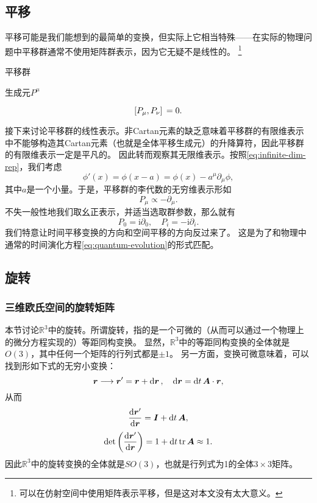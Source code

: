 \documentclass[hyperref, UTF8, a4paper]{ctexart}
\newcommand*{\ii}{\mathrm{i}}
\newcommand*{\reals}{\mathbb{R}}
\begin{document}
\subsection{平移}\label{sec:translation}

平移可能是我们能想到的最简单的变换，但实际上它相当特殊——在实际的物理问题中平移群通常不使用矩阵群表示，因为它无疑不是线性的。%
\footnote{可以在仿射空间中使用矩阵表示平移，但是这对本文没有太大意义。}

平移群

生成元$P^\mu$

\begin{equation}
    \comm*{P_\mu}{P_\nu} = 0.
    \label{eq:comm-of-trans}
\end{equation}

接下来讨论平移群的线性表示。非Cartan元素的缺乏意味着平移群的有限维表示中不能够构造其Cartan元素（也就是全体平移生成元）的升降算符，因此平移群的有限维表示一定是平凡的。
因此转而观察其无限维表示。按照\eqref{eq:infinite-dim-rep}，我们考虑
\[
    \phi'(x) = \phi(x - a) = \phi(x) - a^\mu \partial_\mu \phi,
\]
其中$a$是一个小量。于是，平移群的李代数的无穷维表示形如
\[
    P_\mu \propto - \partial_\mu.
\]
不失一般性地我们取幺正表示，并适当选取群参数，那么就有
\begin{equation}
    P_0 = \ii \partial_0, \quad P_i = - \ii \partial_i.
    \label{eq:transition-inf-rep}
\end{equation}
我们特意让时间平移变换的方向和空间平移的方向反过来了。
这是为了和物理中通常的时间演化方程\eqref{eq:quantum-evolution}的形式匹配。

\subsection{旋转}\label{sec:rotation}

\subsubsection{三维欧氏空间的旋转矩阵}

本节讨论$\reals^3$中的旋转。所谓旋转，指的是一个可微的（从而可以通过一个物理上的微分方程实现的）等距同构变换。
显然，$\reals^3$中的等距同构变换的全体就是$O(3)$，其中任何一个矩阵的行列式都是$\pm 1$。
另一方面，变换可微意味着，可以找到形如下式的无穷小变换：
\[
    \vb*{r} \longrightarrow \vb*{r}' = \vb*{r} + \dd{\vb*{r}}, \quad \dd{\vb*{r}} = \dd{t} \vb*{A} \cdot \vb*{r},
\]
从而
\[
    \dv{\vb*{r}'}{\vb*{r}} = \vb*{I} + \dd{t} \vb*{A},
\]
\[
    \det \left( \dv{\vb*{r}'}{\vb*{r}} \right) = 1 + \dd{t} \trace \vb*{A} \approx 1.
\]
因此$\reals^3$中的旋转变换的全体就是$SO(3)$，也就是行列式为1的全体$3\times 3$矩阵。
\end{document}
